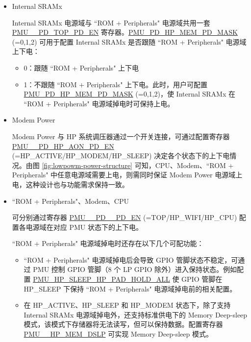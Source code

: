 \documentclass[main\_\_CN.tex]{subfiles}
\begin{document}
\begin{itemize}
\item Internal SRAMx

    Internal SRAMx 电源域与 ``ROM + Peripherals" 电源域共用一套 \hyperref[fielddesc:PMUHPACTIVEPDTOPPDEN]{PMU\_\_PD\_TOP\_PD\_EN} 寄存器。\hyperref[fielddesc:PMUPDHPMEM0PDMASK]{PMU\_PD\_HP\_MEM\_PD\_MASK} (=0,1,2) 可用于配置 Internal SRAMx 是否跟随 ``ROM + Peripherals" 电源域上下电：
    \begin{itemize}
        \item 0：跟随 ``ROM + Peripherals" 上下电
        \item 1：不跟随 ``ROM + Peripherals" 上下电。此时，用户可配置 \hyperref[fielddesc:PMUPDHPMEM0PDMASK]{PMU\_PD\_HP\_MEM\_PD\_MASK} (=0,1,2)，使 Internal SRAMx 在 ``ROM + Peripherals" 电源域掉电时可保持上电。
    \end{itemize}

\item Modem Power

    Modem Power 与 HP 系统调压器通过一个开关连接，可通过配置寄存器 \hyperref[fielddesc:PMUHPACTIVEPDHPAONPDEN]{PMU\_\_PD\_HP\_AON\_PD\_EN} (=HP\_ACTIVE/HP\_MODEM/HP\_SLEEP) 决定各个状态下的上下电情况。由图 \ref{fig:lowpowm-power-structure} 可知，CPU、Modem、``ROM + Peripherals" 中任意电源域需要上电，则需同时保证 Modem Power 电源域上电，这种设计也与功能需求保持一致。

\item ``ROM + Peripherals"、Modem、CPU

    可分别通过寄存器 \hyperref[fielddesc:PMUHPACTIVEPDHPCPUPDEN]{PMU\_\_PD\_\_PD\_EN} (=TOP/HP\_WIFI/HP\_CPU) 配置各电源域在对应 PMU 状态下的上下电。

    ``ROM + Peripherals" 电源域掉电时还存在以下几个可配功能：
        \begin{itemize}
        \item ``ROM + Peripherals" 电源域掉电后会导致 GPIO 管脚状态不稳定，可通过 PMU 控制 GPIO 管脚（8 个 LP GPIO 除外）进入保持状态。例如配置 \hyperref[fielddesc:PMUHPSLEEPHPPADHOLDALL]{PMU\_HP\_SLEEP\_HP\_PAD\_HOLD\_ALL} 使 GPIO 管脚在 HP\_SLEEP 下保持 ``ROM + Peripherals" 电源域掉电前的相关配置。

        \item 在 HP\_ACTIVE、HP\_SLEEP 和 HP\_MODEM 状态下，除了支持 Internal SRAMx 电源域掉电外，还支持标准供电下的 Memory Deep-sleep 模式，该模式下存储器将无法读写，但可以保持数据。配置寄存器 \hyperref[fielddesc:PMUHPACTIVEHPMEMDSLP]{PMU\_\_HP\_MEM\_DSLP} 可实现 Memory Deep-sleep 模式。
        \end{itemize}


\end{itemize}
\end{document}
